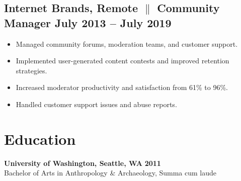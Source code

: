 \documentclass[a4paper,10pt]{article}
\begin{document}
\subsection{Internet Brands, Remote {$\parallel$}{ Community Manager} \hfill
      \textbf{July 2013 – July
            2019}}
\begin{itemize}
      \item Managed community forums, moderation teams, and customer
            support.
      \item Implemented user-generated content contests and improved
            retention strategies.
      \item Increased moderator productivity and satisfaction from 61\%
            to
            96\%.
      \item Handled customer support issues and abuse reports.
\end{itemize}

\section{Education}
\textbf{University of Washington, Seattle, WA} \hfill
\textbf{2011}
\\
Bachelor of Arts in Anthropology \& Archaeology, Summa cum laude
\end{document}
